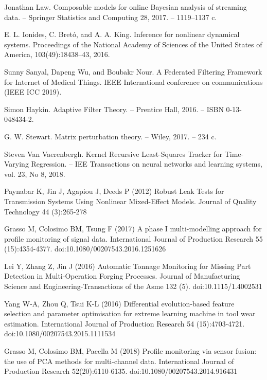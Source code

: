 \begin{thebibliography}{00}
    Jonathan Law.
    Composable models for online Bayesian analysis of streaming data.
    -- Springer Statistics and Computing 28, 2017. -- 1119–1137 c.

    E. L. Ionides, C. Bretó, and A. A. King. 
    Inference for nonlinear dynamical systems.
    Proceedings of the National Academy of Sciences of the United States of America, 
    103(49):18438–43, 2016.

    Sunny Sanyal, Dapeng Wu, and Boubakr Nour.
    A Federated Filtering Framework for Internet of Medical Things.
    IEEE International conference on communications (IEEE ICC 2019).

    Simon Haykin.
    Adaptive Filter Theory. 
    -- Prentice Hall, 2016.
    -- ISBN 0-13-048434-2.

    G. W. Stewart. 
    Matrix perturbation theory. 
    -- Wiley, 2017. -- 234 c.

    Steven Van Vaerenbergh.
    Kernel Recursive Least-Squares Tracker
    for Time-Varying Regression.
    -- IEE Transactions on neural networks and learning systems, vol. 23, No 8, 2018.

    Paynabar K, Jin J, Agapiou J, Deeds P (2012) Robust Leak Tests for
    Transmission Systems Using Nonlinear Mixed-Effect Models. Journal of
    Quality Technology 44 (3):265-278

    Grasso M, Colosimo BM, Tsung F (2017) A phase I multi-modelling
    approach for profile monitoring of signal data. International Journal of
    Production
    Research
    55
    (15):4354-4377.
    doi:10.1080/00207543.2016.1251626

    Lei Y, Zhang Z, Jin J (2016) Automatic Tonnage Monitoring for Missing
    Part Detection in Multi-Operation Forging Processes. Journal of
    Manufacturing Science and Engineering-Transactions of the Asme 132
    (5). doi:10.1115/1.4002531

    Yang W-A, Zhou Q, Tsui K-L (2016) Differential evolution-based feature
    selection and parameter optimisation for extreme learning machine in tool
    wear estimation. International Journal of Production Research 54
    (15):4703-4721. doi:10.1080/00207543.2015.1111534

    Grasso M, Colosimo BM, Pacella M (2018) Profile monitoring via sensor
    fusion: the use of PCA methods for multi-channel data. 
    International Journal of Production Research 52(20):6110-6135.
    doi:10.1080/00207543.2014.916431


\end{thebibliography}
